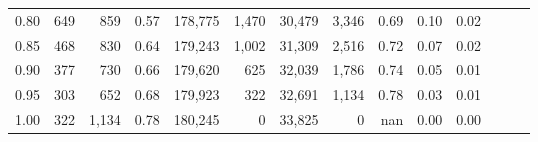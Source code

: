 \begin{tabular}{rrrrrrrrrrrrrr}
0.80 &     649 &    859 &  0.57 &  178,775 &    1,470 &  30,479 &   3,346 &  0.69 &  0.10 &      0.02 \\
0.85 &     468 &    830 &  0.64 &  179,243 &    1,002 &  31,309 &   2,516 &  0.72 &  0.07 &      0.02 \\
0.90 &     377 &    730 &  0.66 &  179,620 &      625 &  32,039 &   1,786 &  0.74 &  0.05 &      0.01 \\
0.95 &     303 &    652 &  0.68 &  179,923 &      322 &  32,691 &   1,134 &  0.78 &  0.03 &      0.01 \\
1.00 &     322 &  1,134 &  0.78 &  180,245 &        0 &  33,825 &       0 &   nan &  0.00 &      0.00 \\
\bottomrule
\end{tabular}
